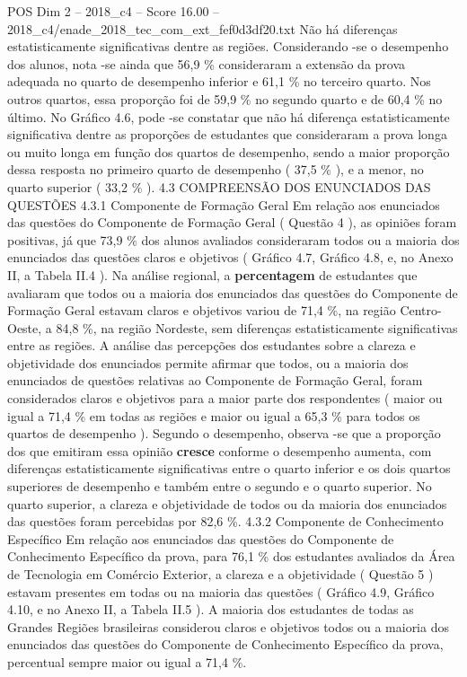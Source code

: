 \begin{textsample}{POS Dim 2 – 2018\_c4 – Score 16.00 – 2018\_c4/enade\_2018\_tec\_com\_ext\_fef0d3df20.txt}
Não há diferenças estatisticamente significativas dentre as regiões.
Considerando -se o desempenho dos alunos, nota -se ainda que 56,9 \% consideraram a extensão da prova adequada no quarto de desempenho inferior e 61,1 \% no terceiro quarto.
Nos outros quartos, essa proporção foi de 59,9 \% no segundo quarto e de 60,4 \% no último.
No Gráfico 4.6, pode -se constatar que não há diferença estatisticamente significativa dentre as proporções de estudantes que consideraram a prova longa ou muito longa em função dos quartos de desempenho, sendo a maior proporção dessa resposta no primeiro quarto de desempenho ( 37,5 \% ), e a menor, no quarto superior ( 33,2 \% ). 4.3 COMPREENSÃO DOS ENUNCIADOS DAS QUESTÕES 4.3.1 Componente de Formação Geral Em relação aos enunciados das questões do Componente de Formação Geral ( Questão 4 ), as opiniões foram positivas, já que 73,9 \% dos alunos avaliados consideraram todos ou a maioria dos enunciados das questões claros e objetivos ( Gráfico 4.7, Gráfico 4.8, e, no Anexo II, a Tabela II.4 ).
Na análise regional, a \textbf{percentagem} de estudantes que avaliaram que todos ou a maioria dos enunciados das questões do Componente de Formação Geral estavam claros e objetivos variou de 71,4 \%, na região Centro-Oeste, a 84,8 \%, na região Nordeste, sem diferenças estatisticamente significativas entre as regiões.
A análise das percepções dos estudantes sobre a clareza e objetividade dos enunciados permite afirmar que todos, ou a maioria dos enunciados de questões relativas ao Componente de Formação Geral, foram considerados claros e objetivos para a maior parte dos respondentes ( maior ou igual a 71,4 \% em todas as regiões e maior ou igual a 65,3 \% para todos os quartos de desempenho ).
Segundo o desempenho, observa -se que a proporção dos que emitiram essa opinião \textbf{cresce} conforme o desempenho aumenta, com diferenças estatisticamente significativas entre o quarto inferior e os dois quartos superiores de desempenho e também entre o segundo e o quarto superior.
No quarto superior, a clareza e objetividade de todos ou da maioria dos enunciados das questões foram percebidas por 82,6 \%. 4.3.2 Componente de Conhecimento Específico Em relação aos enunciados das questões do Componente de Conhecimento Específico da prova, para 76,1 \% dos estudantes avaliados da Área de Tecnologia em Comércio Exterior, a clareza e a objetividade ( Questão 5 ) estavam presentes em todas ou na maioria das questões ( Gráfico 4.9, Gráfico 4.10, e no Anexo II, a Tabela II.5 ).
A maioria dos estudantes de todas as Grandes Regiões brasileiras considerou claros e objetivos todos ou a maioria dos enunciados das questões do Componente de Conhecimento Específico da prova, percentual sempre maior ou igual a 71,4 \%.

\end{textsample}
